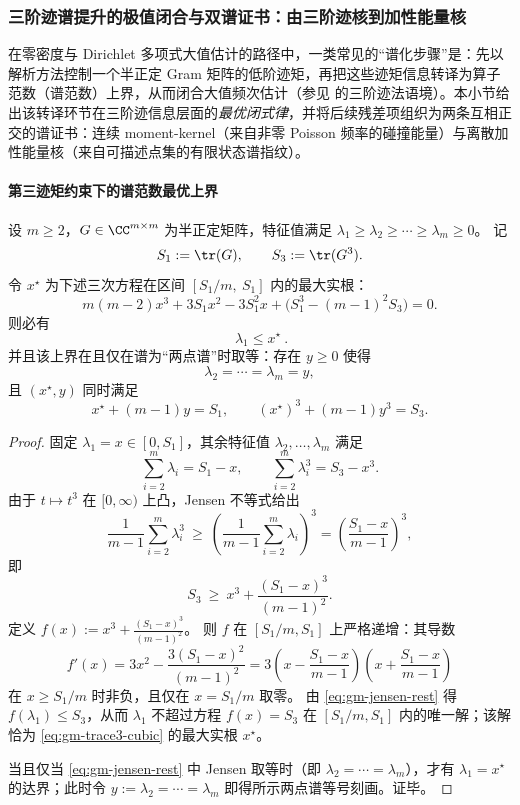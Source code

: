 \subsubsection{三阶迹谱提升的极值闭合与双谱证书：由三阶迹核到加性能量核}\label{subsubsec:gm-third-trace-dual-certificates}
在零密度与 Dirichlet 多项式大值估计的路径中，一类常见的“谱化步骤”是：先以解析方法控制一个半正定 Gram 矩阵的低阶迹矩，再把这些迹矩信息转译为算子范数（谱范数）上界，从而闭合大值频次估计（参见 \cite{GuthMaynard2024LargeValues} 的三阶迹法语境）。本小节给出该转译环节在三阶迹信息层面的\emph{最优闭式律}，并将后续残差项组织为两条互相正交的谱证书：连续 moment-kernel（来自非零 Poisson 频率的碰撞能量）与离散加性能量核（来自可描述点集的有限状态谱指纹）。

\paragraph{第三迹矩约束下的谱范数最优上界}
\begin{theorem}\label{thm:gm-trace3-spectral-norm-extremal}
设 \(m\ge 2\)，\(G\in\CC^{m\times m}\) 为半正定矩阵，特征值满足
\(\lambda_1\ge\lambda_2\ge\cdots\ge\lambda_m\ge 0\)。
记
\[
S_1:=\tr(G),\qquad S_3:=\tr(G^3).
\]
令 \(x^\star\) 为下述三次方程在区间 \([S_1/m,\ S_1]\) 内的最大实根：
\begin{equation}\label{eq:gm-trace3-cubic}
\boxed{\;
m(m-2)x^3+3S_1x^2-3S_1^2x+\bigl(S_1^3-(m-1)^2S_3\bigr)=0.\;}
\end{equation}
则必有
\[
\boxed{\ \lambda_1\le x^\star\ }.
\]
并且该上界在且仅在谱为“两点谱”时取等：存在 \(y\ge 0\) 使得
\[
\lambda_2=\cdots=\lambda_m=y,
\]
且 \((x^\star,y)\) 同时满足
\[
x^\star+(m-1)y=S_1,\qquad (x^\star)^3+(m-1)y^3=S_3.
\]
\end{theorem}

\begin{proof}
固定 \(\lambda_1=x\in[0,S_1]\)，其余特征值 \(\lambda_2,\dots,\lambda_m\) 满足
\[
\sum_{i=2}^m \lambda_i=S_1-x,\qquad \sum_{i=2}^m \lambda_i^3=S_3-x^3.
\]
由于 \(t\mapsto t^3\) 在 \([0,\infty)\) 上凸，Jensen 不等式给出
\[
\frac{1}{m-1}\sum_{i=2}^m \lambda_i^3\ \ge\ \left(\frac{1}{m-1}\sum_{i=2}^m \lambda_i\right)^3
=\left(\frac{S_1-x}{m-1}\right)^3,
\]
即
\begin{equation}\label{eq:gm-jensen-rest}
S_3\ \ge\ x^3+\frac{(S_1-x)^3}{(m-1)^2}.
\end{equation}
定义
\(
f(x):=x^3+\frac{(S_1-x)^3}{(m-1)^2}
\)。
则 \(f\) 在 \([S_1/m,S_1]\) 上严格递增：其导数
\[
f'(x)=3x^2-\frac{3(S_1-x)^2}{(m-1)^2}
=3\left(x-\frac{S_1-x}{m-1}\right)\left(x+\frac{S_1-x}{m-1}\right)
\]
在 \(x\ge S_1/m\) 时非负，且仅在 \(x=S_1/m\) 取零。
由 \eqref{eq:gm-jensen-rest} 得 \(f(\lambda_1)\le S_3\)，从而 \(\lambda_1\) 不超过方程 \(f(x)=S_3\) 在 \([S_1/m,S_1]\) 内的唯一解；该解恰为 \eqref{eq:gm-trace3-cubic} 的最大实根 \(x^\star\)。

当且仅当 \eqref{eq:gm-jensen-rest} 中 Jensen 取等时（即 \(\lambda_2=\cdots=\lambda_m\)），才有 \(\lambda_1=x^\star\) 的达界；此时令 \(y:=\lambda_2=\cdots=\lambda_m\) 即得所示两点谱等号刻画。证毕。
\end{proof}

